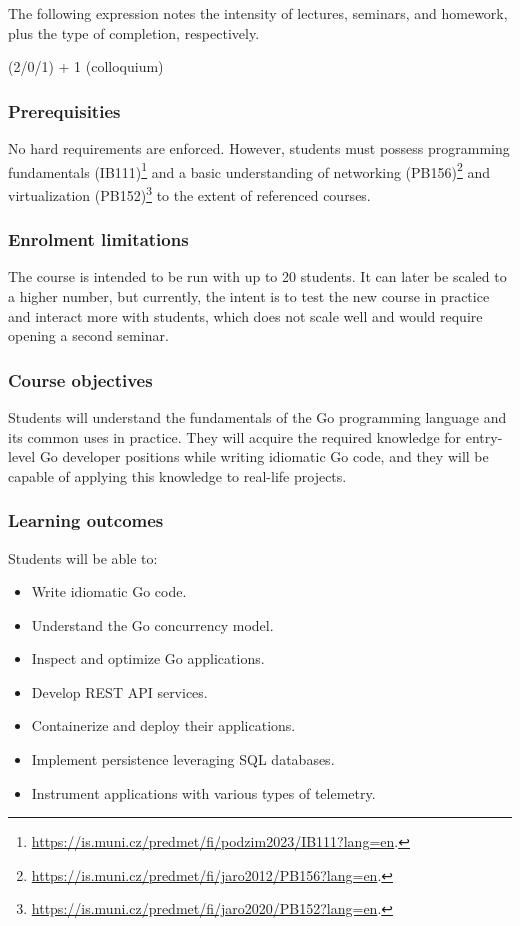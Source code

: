 \documentclass[
  digital,
  color,
  oneside,
  nosansbold,
  nocolorbold,
  lof,
  lot,
]{fithesis4}
\begin{document}
The following expression notes the intensity of lectures, seminars, and homework, plus the type of completion, respectively.

(2/0/1) + 1 (colloquium)

\subsubsection{Prerequisities}

No hard requirements are enforced. However, students must possess programming fundamentals (IB111)\footnote{ \url{https://is.muni.cz/predmet/fi/podzim2023/IB111?lang=en}.} and a basic understanding of networking (PB156)\footnote{\url{https://is.muni.cz/predmet/fi/jaro2012/PB156?lang=en}.} and virtualization (PB152)\footnote{\url{https://is.muni.cz/predmet/fi/jaro2020/PB152?lang=en}.} to the extent of referenced courses.

\subsubsection{Enrolment limitations}

The course is intended to be run with up to 20 students. It can later be scaled to a higher number, but currently, the intent is to test the new course in practice and interact more with students, which does not scale well and would require opening a second seminar.

\subsubsection{Course objectives}

Students will understand the fundamentals of the Go programming language and its common uses in practice. They will acquire the required knowledge for entry-level Go developer positions while writing idiomatic Go code, and they will be capable of applying this knowledge to real-life projects.

\subsubsection{Learning outcomes}

Students will be able to:
\begin{itemize}
    \item Write idiomatic Go code.
    \item Understand the Go concurrency model.
    \item Inspect and optimize Go applications.
    \item Develop REST API services.
    \item Containerize and deploy their applications.
    \item Implement persistence leveraging SQL databases.
    \item Instrument applications with various types of telemetry.
\end{itemize}
\end{document}
